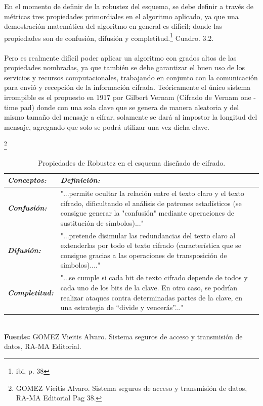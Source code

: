 \documentclass[a4paper,openright,12pt]{book}
\theoremstyle{definition}
\theoremstyle{remark}
\begin{document}
En el momento de definir de la robustez del esquema, se debe definir a través de métricas tres propiedades primordiales en el algoritmo aplicado, ya que una demostración matemática del algoritmo en general es difícil; donde las propiedades son de confusión, difusión y completitud.\footnote{ibi, p. 38} Cuadro. 3.2.\\\\
Pero es realmente difícil poder aplicar un algoritmo con grados altos de las propiedades nombradas, ya que también se debe garantizar el buen uso de los servicios y recursos computacionales, trabajando en conjunto con la comunicación para envió y recepción de la información cifrada. Teóricamente el único sistema irrompible es el propuesto en 1917 por Gilbert Vernam (Cifrado de Vernam one - time pad) donde con una sola clave que se genera de manera aleatoria y del mismo tamaño del mensaje a cifrar, solamente se dará al impostor la longitud del mensaje, agregando que solo se podrá utilizar una vez dicha clave.

\begin{table}[ht]
\centering
\caption{Propiedades de Robustez en el esquema diseñado de cifrado.}\footnote{GOMEZ Vieitis Alvaro. Sistema seguros de acceso y transmisión de datos, RA-MA Editorial Pag 38.}
\begin{tabular}{>{\centering\arraybackslash}m{3cm} >{\arraybackslash}m{10cm} }
\hline
\textbf{\textit{Conceptos:}} & \textbf{\textit{Definición:}} \\ \hline
\textbf{\textit{Confusión:}} & "...permite ocultar la relación entre el texto claro y el texto cifrado, dificultando el análisis de patrones estadísticos (se consigue generar la "confusión" mediante operaciones de sustitución de símbolos)..." \\ \hline
\textbf{\textit{Difusión:}} & "...pretende disimular las redundancias del texto claro al extenderlas por todo el texto cifrado (característica que se consigue gracias a las operaciones de transposición de símbolos)...." \\ \hline
\textbf{\textit{Completitud:}} & "...se cumple si cada bit de texto cifrado depende de todos y cada uno de los bits de la clave. En otro caso, se podrían realizar ataques contra determinadas partes de la clave, en una estrategia de “divide y vencerás”..." \\ \hline
\end{tabular}
\label{tabla:RobustezPropiedades}
\\\textbf{Fuente:} GOMEZ Vieitis Alvaro. Sistema seguros de acceso y transmisión de datos, RA-MA Editorial.
\end{table}
\end{document}
